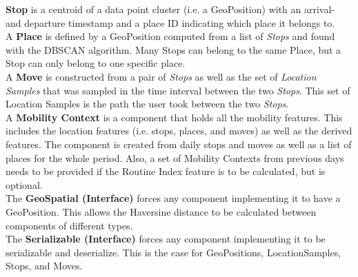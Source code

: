 \textbf{Stop} is a centroid of a data point cluster (i.e. a GeoPosition) with an arrival- and departure timestamp and a place ID indicating which place it belongs to.\\

A \textbf{Place} is defined by a GeoPosition computed from a list of \textit{Stops} and found with the DBSCAN algorithm. Many Stops can belong to the same Place, but a Stop can only belong to one specific place.\\

A \textbf{Move} is constructed from a pair of \textit{Stops} as well as the set of \textit{Location Samples} that was sampled in the time interval between the two \textit{Stops}. This set of Location Samples is the path the user took between the two \textit{Stops}.\\

A \textbf{Mobility Context} is a component that holds all the mobility features. This includes the location features (i.e. stops, places, and moves) as well as the derived features. The component is created from daily stops and moves as well as a list of places for the whole period. Also, a set of Mobility Contexts from previous days needs to be provided if the Routine Index feature is to be calculated, but is optional. \\

The \textbf{GeoSpatial (Interface)} forces any component implementing it to have a GeoPosition. This allows the Haversine distance to be calculated between components of different types.\\

The \textbf{Serializable (Interface)} forces any component implementing it to be serializable and deserialize. This is the case for GeoPositions, LocationSamples, Stops, and Moves.
